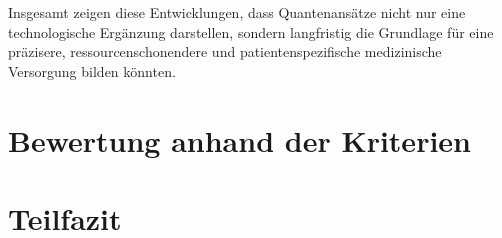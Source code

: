 Insgesamt zeigen diese Entwicklungen, dass Quantenansätze nicht nur eine technologische Ergänzung darstellen, sondern langfristig die Grundlage für eine präzisere, ressourcenschonendere und patientenspezifische medizinische Versorgung bilden könnten.



\section{Bewertung anhand der Kriterien}





\section{Teilfazit}


\printbibliography
